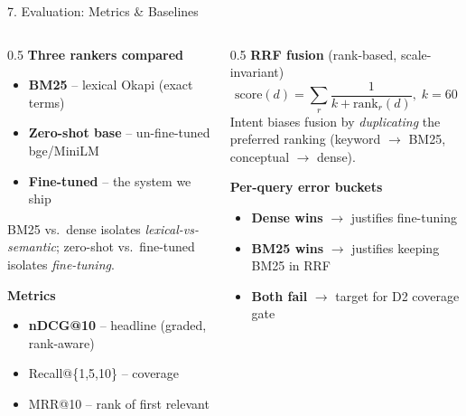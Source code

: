 \documentclass[10pt,aspectratio=169]{beamer}
\begin{document}
\begin{frame}{7. Evaluation: Metrics \& Baselines}
\begin{columns}[T]
\begin{column}{0.5\textwidth}
\textbf{Three rankers compared}
\begin{itemize}\small
  \item \textbf{BM25} -- lexical Okapi (exact terms)
  \item \textbf{Zero-shot base} -- un-fine-tuned bge/MiniLM
  \item \textbf{Fine-tuned} -- the system we ship
\end{itemize}
BM25 vs.\ dense isolates \emph{lexical-vs-semantic}; zero-shot vs.\ fine-tuned isolates \emph{fine-tuning}.

\vspace{0.15cm}
\textbf{Metrics}
\begin{itemize}\small
  \item \textbf{nDCG@10} -- headline (graded, rank-aware)
  \item Recall@\{1,5,10\} -- coverage
  \item MRR@10 -- rank of first relevant
\end{itemize}
\end{column}
\begin{column}{0.5\textwidth}
\textbf{RRF fusion} (rank-based, scale-invariant)
\[
\text{score}(d)=\sum_{r}\frac{1}{k+\text{rank}_r(d)},\; k=60
\]
\footnotesize Intent biases fusion by \emph{duplicating} the preferred ranking (keyword $\rightarrow$ BM25, conceptual $\rightarrow$ dense).

\vspace{0.15cm}
\textbf{Per-query error buckets}
\begin{itemize}\scriptsize
  \item \textbf{Dense wins} $\rightarrow$ justifies fine-tuning
  \item \textbf{BM25 wins} $\rightarrow$ justifies keeping BM25 in RRF
  \item \textbf{Both fail} $\rightarrow$ target for D2 coverage gate
\end{itemize}
\end{column}
\end{columns}
\end{frame}
\end{document}
